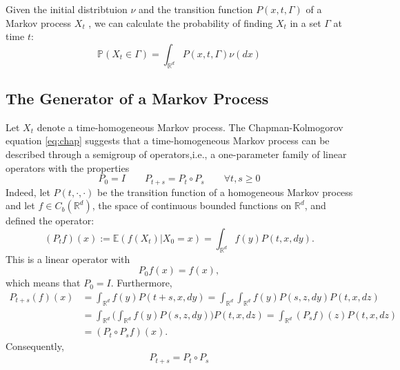 \documentclass{article}
\begin{document}
Given the initial distribtuion $\nu$ and the transition function $P(x,t,\Gamma)$ of a Markov process $X_t$
, we can calculate the probability of finding $X_t$ in a set $\Gamma$ at time $t$:
\begin{equation*}
    \mathbb{P}(X_t \in \Gamma)=\int_{\mathbb{R}^d}P(x,t,\Gamma)\nu(dx)
\end{equation*}

\subsection*{The Generator of a Markov Process}
Let $X_t$ denote a time-homogeneous Markov process. The Chapman-Kolmogorov equation \eqref{eq:chap} suggests that a time-homogeneous Markov process can be described through a semigroup of operators,i.e., a one-parameter family of linear operators with the properties 
$$P_0=I\qquad P_{t+s}=P_t \circ P_s \qquad \forall t,s\geq 0$$
Indeed, let $P(t,\cdot,\cdot)$ be the transition function of a homogeneous Markov process and let $f\in C_b(\mathbb{R}^d)$, the space of continuous bounded functions on $\mathbb{R}^d$, and defined the operator:
\begin{equation}
    (P_tf)(x):=\mathbb{E}(f(X_t)|X_0=x)=\int_{\mathbb{R}^d}f(y)P(t,x,dy). \label{eq:semi}
\end{equation}
This is a linear operator with
$$P_0f(x)=f(x),$$
which means that $P_0=I$. Furthermore,
\begin{align*}
P_{t+s}(f)(x)& =\int_{\mathbb{R}^d} f(y)P(t+s,x,dy)=\int_{\mathbb{R}^d} \int_{\mathbb{R}^d} f(y) P(s,z,dy)P(t,x,dz)\\
&= \int_{\mathbb{R}^d} \big(\int_{\mathbb{R}^d} f(y)P(s,z,dy)\big) P(t,x,dz) = \int_{\mathbb{R}^d}
    (P_sf)(z)P(t,x,dz)\\
    &=(P_t \circ P_s f)(x).
\end{align*}
Consequently,
$$P_{t+s}=P_t \circ P_s$$
\end{document}
